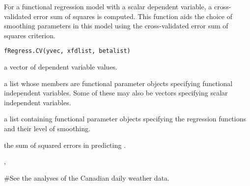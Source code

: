 \documentclass{article}
\begin{document}
\begin{Description}\relax
For a functional regression model with a scalar dependent variable,
a cross-validated error sum of squares is computed.  This function
aids the choice of smoothing parameters in this model using the
cross-validated error sum of squares criterion.
\end{Description}
\begin{Usage}
\begin{verbatim}
fRegress.CV(yvec, xfdlist, betalist)
\end{verbatim}
\end{Usage}
\begin{Arguments}
\begin{ldescription}
\item[\code{yvec}] a vector of dependent variable values.

\item[\code{xfdlist}] a list whose members are functional parameter objects
specifying functional independent variables.  Some
of these may also be vectors specifying scalar independent
variables.

\item[\code{betalist}] a list containing functional parameter objects specifying the
regression functions and their level of smoothing.

\end{ldescription}
\end{Arguments}
\begin{Value}
the sum of squared errors in predicting .
\end{Value}
\begin{SeeAlso}\relax
{}, 
\end{SeeAlso}
\begin{Examples}
\begin{ExampleCode}
#See the analyses of the Canadian daily weather data.
\end{ExampleCode}
\end{Examples}
\end{document}
